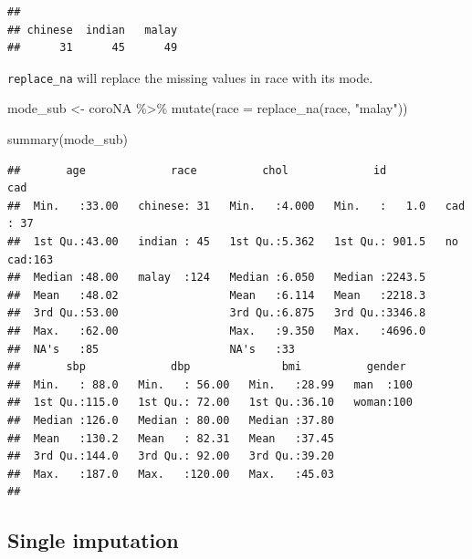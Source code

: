 \documentclass[
  10pt,
]{krantz}
\newenvironment{Shaded}{\begin{snugshade}}{\end{snugshade}}
\newcommand{\AttributeTok}[1]{\textcolor[rgb]{0.77,0.63,0.00}{#1}}
\newcommand{\FunctionTok}[1]{\textcolor[rgb]{0.00,0.00,0.00}{#1}}
\newcommand{\NormalTok}[1]{#1}
\newcommand{\OtherTok}[1]{\textcolor[rgb]{0.56,0.35,0.01}{#1}}
\newcommand{\SpecialCharTok}[1]{\textcolor[rgb]{0.00,0.00,0.00}{#1}}
\newcommand{\StringTok}[1]{\textcolor[rgb]{0.31,0.60,0.02}{#1}}
\begin{document}
\begin{Shaded}
\end{Shaded}

\begin{verbatim}
## 
## chinese  indian   malay 
##      31      45      49
\end{verbatim}

\texttt{replace\_na} will replace the missing values in race with its mode.

\begin{Shaded}
\begin{Highlighting}[]
\NormalTok{mode\_sub }\OtherTok{\textless{}{-}} 
\NormalTok{  coroNA }\SpecialCharTok{\%\textgreater{}\%} 
  \FunctionTok{mutate}\NormalTok{(}\AttributeTok{race =} \FunctionTok{replace\_na}\NormalTok{(race, }\StringTok{"malay"}\NormalTok{))}

\FunctionTok{summary}\NormalTok{(mode\_sub)}
\end{Highlighting}
\end{Shaded}

\begin{verbatim}
##       age             race          chol             id             cad     
##  Min.   :33.00   chinese: 31   Min.   :4.000   Min.   :   1.0   cad   : 37  
##  1st Qu.:43.00   indian : 45   1st Qu.:5.362   1st Qu.: 901.5   no cad:163  
##  Median :48.00   malay  :124   Median :6.050   Median :2243.5               
##  Mean   :48.02                 Mean   :6.114   Mean   :2218.3               
##  3rd Qu.:53.00                 3rd Qu.:6.875   3rd Qu.:3346.8               
##  Max.   :62.00                 Max.   :9.350   Max.   :4696.0               
##  NA's   :85                    NA's   :33                                   
##       sbp             dbp              bmi          gender   
##  Min.   : 88.0   Min.   : 56.00   Min.   :28.99   man  :100  
##  1st Qu.:115.0   1st Qu.: 72.00   1st Qu.:36.10   woman:100  
##  Median :126.0   Median : 80.00   Median :37.80              
##  Mean   :130.2   Mean   : 82.31   Mean   :37.45              
##  3rd Qu.:144.0   3rd Qu.: 92.00   3rd Qu.:39.20              
##  Max.   :187.0   Max.   :120.00   Max.   :45.03              
## 
\end{verbatim}

\hypertarget{single-imputation}{%
\subsection{\texorpdfstring{Single imputation}{Single imputation}}\label{single-imputation}}
\end{document}
